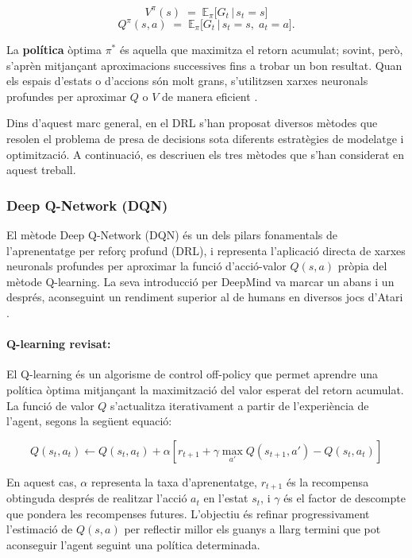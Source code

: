 \documentclass[12pt,a4paper,twoside]{book}
\begin{document}
\begin{equation}
V^\pi(s) \;=\; \mathbb{E}_\pi\bigl[G_t \,\big\vert\, s_t = s\bigr]
\end{equation}
\begin{equation}
Q^\pi(s,a) \;=\; \mathbb{E}_\pi\bigl[G_t \,\big\vert\, s_t = s,\; a_t = a\bigr].
\end{equation}

La \textbf{política} òptima $\pi^*$ és aquella que maximitza el retorn acumulat; sovint, però, s'aprèn mitjançant aproximacions successives fins a trobar un bon resultat. Quan els espais d'estats o d'accions són molt grans, s'utilitzsen xarxes neuronals profundes per aproximar $Q$ o $V$ de manera eficient \cite{RLIntro}.

\vspace{2ex}
Dins d'aquest marc general, en el DRL s'han proposat diversos mètodes que resolen el problema de presa de decisions sota diferents estratègies de modelatge i optimització. A continuació, es descriuen els tres mètodes que s'han considerat en aquest treball.

\subsubsection{Deep Q-Network (DQN)}

El mètode Deep Q-Network (DQN) és un dels pilars fonamentals de l'aprenentatge per reforç profund (DRL), i representa l'aplicació directa de xarxes neuronals profundes per aproximar la funció d'acció-valor $Q(s, a)$ pròpia del mètode Q-learning. La seva introducció per DeepMind \cite{MnihNature2015} va marcar un abans i un després, aconseguint un rendiment superior al de humans en diversos jocs d'Atari \cite{M9}.

\paragraph{Q-learning revisat:}
El Q-learning és un algorisme de control off-policy que permet aprendre una política òptima mitjançant la maximització del valor esperat del retorn acumulat. La funció de valor $Q$ s’actualitza iterativament a partir de l’experiència de l’agent, segons la següent equació:

\begin{equation}
Q(s_t, a_t) \leftarrow Q(s_t, a_t) + \alpha \left[ r_{t+1} + \gamma \max_{a'} Q(s_{t+1}, a') - Q(s_t, a_t) \right]
\end{equation}

En aquest cas, $\alpha$ representa la taxa d’aprenentatge, $r_{t+1}$ és la recompensa obtinguda després de realitzar l’acció $a_t$ en l’estat $s_t$, i $\gamma$ és el factor de descompte que pondera les recompenses futures. L’objectiu és refinar progressivament l’estimació de $Q(s,a)$ per reflectir millor els guanys a llarg termini que pot aconseguir l’agent seguint una política determinada.
\end{document}
